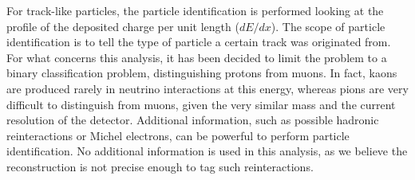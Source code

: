 \documentclass[a4paper]{article}
\begin{document}
For track-like particles, the particle identification is performed looking at the profile of the deposited charge per unit length ($dE/dx$).
The scope of particle identification is to tell the type of particle a certain track was originated from.
For what concerns this analysis, it has been decided to limit the problem to a binary classification problem, distinguishing protons from muons.
In fact, kaons are produced rarely in neutrino interactions at this energy, whereas pions are very difficult to distinguish from muons, given the very similar mass and the current resolution of the detector.
Additional information, such as possible hadronic reinteractions or Michel electrons, can be powerful to perform particle identification.
No additional information is used in this analysis, as we believe the reconstruction is not precise enough to tag such reinteractions.
\end{document}
